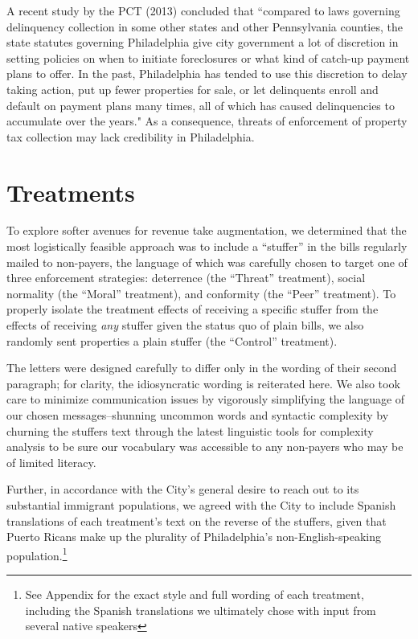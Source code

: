 \documentclass[12pt,titlepage]{article}
\begin{document}
A recent study by the PCT (2013) concluded that ``compared to laws
governing delinquency collection in some other states and other
Pennsylvania counties, the state statutes governing Philadelphia give
city government a lot of discretion in setting policies on when to
initiate foreclosures or what kind of catch-up payment plans to
offer. In the past, Philadelphia has tended to use this discretion to
delay taking action, put up fewer properties for sale, or let
delinquents enroll and default on payment plans many times, all of
which has caused delinquencies to accumulate over the years." As a
consequence, threats of enforcement of property tax collection may
lack credibility in Philadelphia.

\section{Treatments}

To explore softer avenues for revenue take augmentation, we determined
that the most logistically feasible approach was to include a
``stuffer'' in the bills regularly mailed to non-payers, the language
of which was carefully chosen to target one of three enforcement
strategies: deterrence (the ``Threat'' treatment), social normality
(the ``Moral'' treatment), and conformity (the ``Peer'' treatment). To
properly isolate the treatment effects of receiving a specific stuffer
from the effects of receiving \textit{any} stuffer given the status
quo of plain bills, we also randomly sent properties a plain stuffer
(the ``Control'' treatment).

The letters were designed carefully to differ only in the wording of
their second paragraph; for clarity, the idiosyncratic wording is
reiterated here. We also took care to minimize communication issues by
vigorously simplifying the language of our chosen messages--shunning
uncommon words and syntactic complexity by churning the stuffers text
through the latest linguistic tools for complexity analysis to be sure
our vocabulary was accessible to any non-payers who may be of limited
literacy.

Further, in accordance with the City's general desire to reach out to
its substantial immigrant populations, we agreed with the City to
include Spanish translations of each treatment's text on the reverse
of the stuffers, given that Puerto Ricans make up the plurality of
Philadelphia's non-English-speaking population.\footnote{See Appendix
  for the exact style and full wording of each treatment, including
  the Spanish translations we ultimately chose with input from several
  native speakers}
\end{document}
